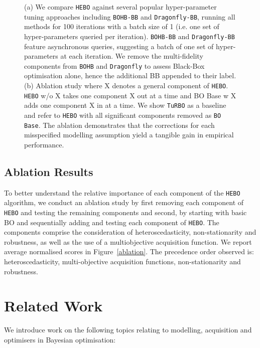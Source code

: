 \documentclass[jair,twoside,11pt,theapa]{article}
\theoremstyle{definition}
\begin{document}
\begin{figure}[t!]\centering
{}
\qquad
{}
\caption{(a) We compare \texttt{HEBO} against several popular hyper-parameter tuning approaches including \texttt{BOHB-BB} and \texttt{Dragonfly-BB}, running all methods for 100 iterations with a batch size of 1 (i.e. one set of hyper-parameters queried per iteration). \texttt{BOHB-BB} and \texttt{Dragonfly-BB} feature asynchronous queries, suggesting a batch of one set of hyper-parameters at each iteration. We remove the multi-fidelity components from \texttt{BOHB} and \texttt{Dragonfly} to assess Black-Box optimisation alone, hence the additional BB appended to their label. (b) Ablation study where X denotes a general component of \texttt{HEBO}. \texttt{HEBO} w/o X takes one component X out at a time and BO Base w X adds one component X in at a time. We show \texttt{TuRBO} as a baseline and refer to \texttt{HEBO} with all significant components removed as \texttt{BO Base}. The ablation demonstrates that the corrections for each misspecified modelling assumption yield a tangible gain in empirical performance.}

\label{Fig:ResOne2}
\end{figure}


\subsection{Ablation Results} To better understand the relative importance of each component of the \texttt{HEBO} algorithm, we conduct an ablation study by first removing each component of \texttt{HEBO} and testing the remaining components and second, by starting with basic BO and sequentially adding and testing each component of \texttt{HEBO}. The components comprise the consideration of heteroscedasticity, non-stationarity and robustness, as well as the use of a multiobjective acquisition function. We report average normalised scores in Figure~\autoref{ablation}. The precedence order observed is: heteroscedasticity, multi-objective acquisition functions, non-stationarity and robustness. 
\section{Related Work}
We introduce work on the following topics relating to modelling, acquisition and optimisers in Bayesian optimisation: \\
\end{document}
